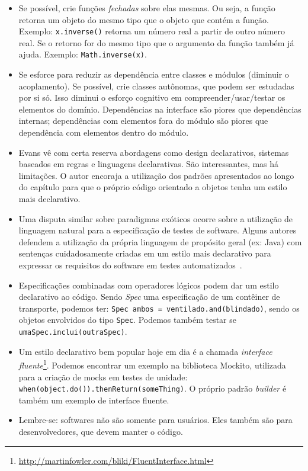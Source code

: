 \documentclass[a4paper, 12pt]{article}
\newcommand{\code}[1]{\texttt{#1}}
\begin{document}
\begin{itemize}
\item Se possível, crie funções \emph{fechadas} sobre elas mesmas. Ou seja, a função retorna um objeto do mesmo tipo que o objeto que contém a função. Exemplo: \code{x.inverse()} retorna um número real a partir de outro número real. Se o retorno for do mesmo tipo que o argumento da função também já ajuda. Exemplo: \code{Math.inverse(x)}.

\item Se esforce para reduzir as dependência entre classes e módulos (diminuir o acoplamento). Se possível, crie classes autônomas, que podem ser estudadas por si só. Isso diminui o esforço cognitivo em compreender/usar/testar os elementos do domínio. Dependências na interface são piores que dependências internas; dependências com elementos fora do módulo são piores que dependência com elementos dentro do módulo.

\item Evans vê com certa reserva abordagens como design declarativos, sistemas baseados em regras e linguagens declarativas. São interessantes, mas há limitações. O autor encoraja a utilização dos padrões apresentados ao longo do capítulo para que o próprio código orientado a objetos tenha um estilo mais declarativo. 

\item Uma disputa similar sobre paradigmas exóticos ocorre sobre a utilização de linguagem natural para a especificação de testes de software. Alguns autores defendem a utilização da própria linguagem de propósito geral (ex: Java) com sentenças cuidadosamente criadas em um estilo mais declarativo para expressar os requisitos do software em testes automatizados~\cite{Freeman2009Tests}.

\item Especificações combinadas com operadores lógicos podem dar um estilo declarativo ao código. Sendo \emph{Spec} uma especificação de um contêiner de transporte, podemos ter: \code{Spec ambos = ventilado.and(blindado)}, sendo os objetos envolvidos do tipo \code{Spec}. Podemos também testar se \code{umaSpec.inclui(outraSpec)}. 

\item Um estilo declarativo bem popular hoje em dia é a chamada \emph{interface fluente}\footnote{\url{http://martinfowler.com/bliki/FluentInterface.html}}. Podemos encontrar um exemplo na biblioteca Mockito, utilizada para a criação de mocks em testes de unidade: \code{when(object.do()).thenReturn(someThing)}. O próprio padrão \emph{builder} é também um exemplo de interface fluente.

\item Lembre-se: softwares não são somente para usuários. Eles também são para desenvolvedores, que devem manter o código.


\end{itemize}
\end{document}
